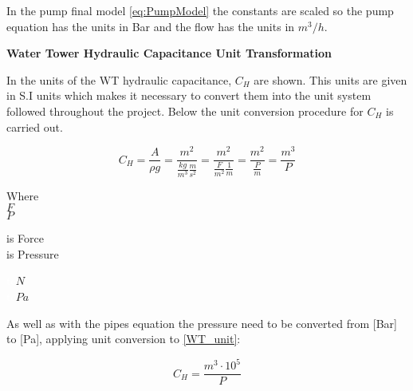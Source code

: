 In the pump final model \eqref{eq:PumpModel} the constants are scaled so the pump equation has the units in Bar and the flow has the units in $m^3/h$.

\textbf{Water Tower Hydraulic Capacitance Unit Transformation}

In  the units of the WT hydraulic capacitance, $C_H$ are shown. This units are given in S.I units which makes it necessary to convert them into the unit system followed throughout the project. Below the unit conversion procedure for $C_H$ is carried out. 

\begin{equation}
	C_H = \frac{A}{\rho g} = \frac{m^2}{\frac{kg}{m^3} \frac{m}{s^2}} = \frac{m^2}{\frac{F}{m^2} \frac{1}{m}} =  \frac{m^2}{\frac{P}{m}} = \frac{m^3}{P}
	\label{WT_unit}
\end{equation}

\begin{minipage}[t]{0.20\textwidth}
Where\\
\hspace*{8mm} $F$ \\
\hspace*{8mm} $P$ \\
\end{minipage}
\begin{minipage}[t]{0.68\textwidth}
\vspace*{2mm}
is Force\\
is Pressure\\
\end{minipage}
\begin{minipage}[t]{0.10\textwidth}
\vspace*{2mm}
\textcolor{White}{te}$\unit{N}$\\
\textcolor{White}{te}$\unit{Pa}$
\end{minipage}

As well as with the pipes equation the pressure need to be converted from [Bar] to [Pa], applying unit conversion to \eqref{WT_unit}:

\begin{equation}
	C_H = \frac{m^{3} \cdot 10^5}{P}
	\label{WT_unit_final}
\end{equation}